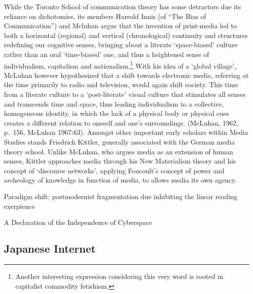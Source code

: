 \documentclass[10pt,british,A4paper,,openany]{memoir}
\begin{document}
While the Toronto School of communication theory has some detractors due
its reliance on dichotomies, its members Harrold Innis (of ``The Bias of
Communication'') and Mcluhan argue that the invention of print-media led
to both a horizontal (regional) and vertical (chronological) continuity
and structures redefining our cognitive senses, bringing about a
literate `space-biased' culture rather than an oral `time-biased' one,
and thus a heightened sense of individualism, capitalism and
nationalism.\footnote{Another interesting expression considering this
  very word is rooted in capitalist commodity fetishism.} With his idea
of a `global village', McLuhan however hypothesized that a shift towards
electronic media, referring at the time primarily to radio and
television, would again shift society. This time from a literate culture
to a `post-literate' visual culture that stimulates all senses and
transcends time and space, thus leading individualism to a collective,
homogeneous identity, in which the lack of a physical body or physical
cues creates a different relation to oneself and one's surroundings.
(McLuhan, 1962, p.~156, McLuhan 1967:63). Amongst other important early
scholars within Media Studies stands Friedrich Kittler, generally
associated with the German media theory school. Unlike McLuhan, who
argues media as an extension of human senses, Kittler approaches media
through his New Materialism theory and his concept of `discourse
networks', applying Foucoult's concept of power and archeology of
knowledge in function of media, to allows media its own agency.

Paradigm shift: postmodernist fragmentation due inhibiting the linear
reading exerpience

A Declaration of the Independence of Cyberspace

\subsection{Japanese Internet}\label{japanese-internet}
\end{document}
